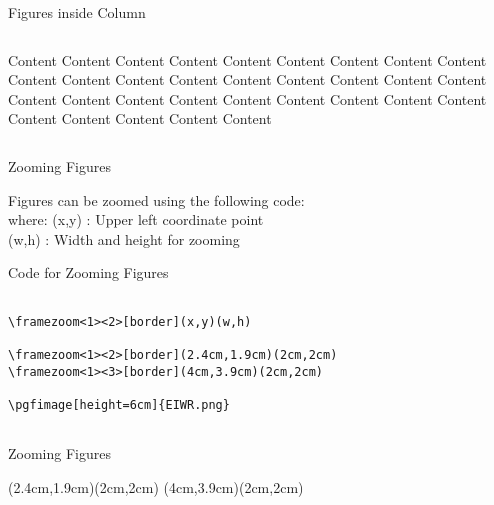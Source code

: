 \documentclass[10pt,xcolor=x11names]{beamer}
\begin{document}
\begin{frame}{Figures inside Column}

\begin{columns}
	
	\begin{column}{0.6\textwidth}
		
	Content Content Content Content Content Content Content Content
	Content Content Content Content Content Content Content Content Content Content Content Content
	Content Content Content Content Content Content Content Content Content Content Content Content

	\end{column}

	\begin{column}{0.4\textwidth}
	\end{column}
\end{columns}

\end{frame}

\begin{frame}[fragile]{Zooming Figures} 

Figures can be zoomed using the following code:\\
where: 
(x,y) : Upper left coordinate point\\
\hspace{32pt}(w,h) : Width and height for zooming
\begin{exampleblock}{Code for Zooming Figures}
	\begin{verbatim}
		
\framezoom<1><2>[border](x,y)(w,h)
	
\framezoom<1><2>[border](2.4cm,1.9cm)(2cm,2cm)
\framezoom<1><3>[border](4cm,3.9cm)(2cm,2cm)

\pgfimage[height=6cm]{EIWR.png}
	
	\end{verbatim}
\end{exampleblock}

\end{frame}

\begin{frame}{Zooming Figures}

(2.4cm,1.9cm)(2cm,2cm)
(4cm,3.9cm)(2cm,2cm)

\end{frame}
\end{document}
